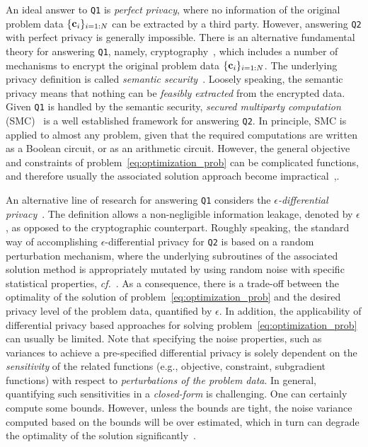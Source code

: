 \documentclass[12pt,draftcls,onecolumn]{IEEEtran}
\newcommand{\cf}{{\textit{cf.}}}
\renewcommand{\vec}[1]{\bf{#1}}     \newcommand{\vecsc}[1]{\mbox {\boldmath \scriptsize $#1$}}     \newcommand{\itvec}[1]{\mbox {\boldmath $#1$}}
\newcommand{\addnew}[1]{{{\color{blue!0!black}#1}}}
\begin{document}
\addnew
{
An ideal answer to \texttt{Q1} is \emph{perfect privacy}, where no information of the original problem data $\{{\vec c}_i\}_{i=1:N}$ can be extracted by a third party. However, answering \texttt{Q2} with perfect privacy is generally impossible. There is an alternative fundamental theory for answering \texttt{Q1}, namely, cryptography~\cite{Goldreich-book-2004}, which includes a number of mechanisms to encrypt the original problem data $\{{\vec c}_i\}_{i=1:N}$. The underlying privacy definition is called \emph{semantic security}~\cite[\S~5]{Goldreich-book-2004}. Loosely speaking, the semantic privacy means that nothing can be \emph{feasibly extracted} from the encrypted data. Given \texttt{Q1} is handled by the semantic security, \emph{secured multiparty computation} (SMC)~\cite{Yao-1982} is a well established framework for answering \texttt{Q2}. In principle, SMC is applied to almost any problem, given that the required computations are written as a Boolean circuit, or as an arithmetic circuit. However, the general objective and constraints of problem~\eqref{eq:optimization_prob} can be complicated functions, and therefore usually the associated solution approach become impractical~\cite{Damgard-06,Toft-2009},\cite[\S~2.3.2]{Bednarz-2012}.
}


\addnew
{
An alternative line of research for answering \texttt{Q1} considers the \emph{$\epsilon$-differential privacy}~\cite{Dwork-McSherry-Nissim-Smith-2006}. The definition allows a non-negligible
information leakage, denoted by $\epsilon$, as opposed to the cryptographic counterpart. Roughly speaking, the standard way of accomplishing $\epsilon$-differential privacy for \texttt{Q2} is based on a random perturbation mechanism, where the underlying subroutines of the associated solution method is appropriately mutated by using random noise with specific statistical properties, \cf~\cite{Chaudhuri-Monteleoni-Sarwate-2011,Kifer-Smith-Thakurta-2012,Guptaetal-2010,Ny-Pappas-CDC-2013,Ny-Pappas-Alerton-2013,Huang-Mitra-Vaidya-2014}. As a consequence, there is a trade-off between the optimality of the solution of problem~\eqref{eq:optimization_prob} and the desired privacy level of the problem data, quantified by $\epsilon$. In addition, the applicability of differential privacy based approaches for solving problem~\eqref{eq:optimization_prob} can usually be limited. Note that specifying the noise properties, such as variances to achieve a pre-specified differential privacy is solely dependent on the \emph{sensitivity} of the related functions (e.g., objective, constraint, subgradient functions) with respect to \emph{perturbations of the problem data}. In general, quantifying such sensitivities in a \emph{closed-form} is challenging. One can certainly compute some bounds. However, unless the bounds are tight, the noise variance computed based on the bounds will be over estimated, which in turn can degrade the optimality of the solution significantly~\cite{Dwork-McSherry-Nissim-Smith-2006,Chaudhuri-Monteleoni-Sarwate-2011,Huang-Mitra-Vaidya-2014}.


}
\end{document}

